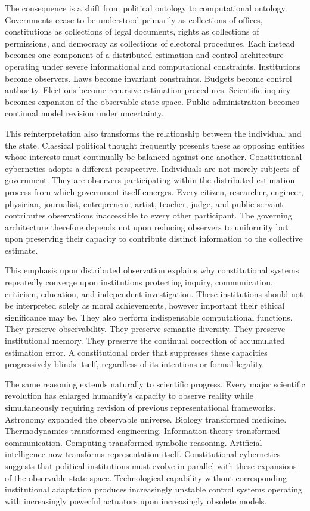 \documentclass[12pt,a4paper]{article}
\begin{document}
The consequence is a shift from political ontology to computational ontology. Governments cease to be understood primarily as collections of offices, constitutions as collections of legal documents, rights as collections of permissions, and democracy as collections of electoral procedures. Each instead becomes one component of a distributed estimation-and-control architecture operating under severe informational and computational constraints. Institutions become observers. Laws become invariant constraints. Budgets become control authority. Elections become recursive estimation procedures. Scientific inquiry becomes expansion of the observable state space. Public administration becomes continual model revision under uncertainty.

This reinterpretation also transforms the relationship between the individual and the state. Classical political thought frequently presents these as opposing entities whose interests must continually be balanced against one another. Constitutional cybernetics adopts a different perspective. Individuals are not merely subjects of government. They are observers participating within the distributed estimation process from which government itself emerges. Every citizen, researcher, engineer, physician, journalist, entrepreneur, artist, teacher, judge, and public servant contributes observations inaccessible to every other participant. The governing architecture therefore depends not upon reducing observers to uniformity but upon preserving their capacity to contribute distinct information to the collective estimate.

This emphasis upon distributed observation explains why constitutional systems repeatedly converge upon institutions protecting inquiry, communication, criticism, education, and independent investigation. These institutions should not be interpreted solely as moral achievements, however important their ethical significance may be. They also perform indispensable computational functions. They preserve observability. They preserve semantic diversity. They preserve institutional memory. They preserve the continual correction of accumulated estimation error. A constitutional order that suppresses these capacities progressively blinds itself, regardless of its intentions or formal legality.

The same reasoning extends naturally to scientific progress. Every major scientific revolution has enlarged humanity's capacity to observe reality while simultaneously requiring revision of previous representational frameworks. Astronomy expanded the observable universe. Biology transformed medicine. Thermodynamics transformed engineering. Information theory transformed communication. Computing transformed symbolic reasoning. Artificial intelligence now transforms representation itself. Constitutional cybernetics suggests that political institutions must evolve in parallel with these expansions of the observable state space. Technological capability without corresponding institutional adaptation produces increasingly unstable control systems operating with increasingly powerful actuators upon increasingly obsolete models.
\end{document}
